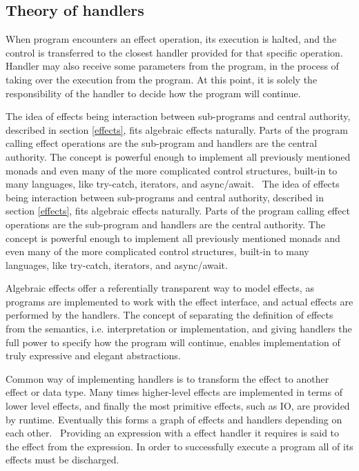 \subsection{Theory of handlers}
When program encounters an effect operation, its execution is halted, and the control is transferred to the closest handler provided for that specific operation. Handler may also receive some parameters from the program, in the process of taking over the execution from the program. At this point, it is solely the responsibility of the handler to decide how the program will continue.

The idea of effects being interaction between sub-programs and central authority, described in section \ref{effects}, fits algebraic effects naturally. Parts of the program calling effect operations are the sub-program and handlers are the central authority. The concept is powerful enough to implement all previously mentioned monads and even many of the more complicated control structures, built-in to many languages, like try-catch, iterators, and async/await.~\cite{alg-effs-for-fp}
The idea of effects being interaction between sub-programs and central authority, described in section \ref{effects}, fits algebraic effects naturally. Parts of the program calling effect operations are the sub-program and handlers are the central authority. The concept is powerful enough to implement all previously mentioned monads and even many of the more complicated control structures, built-in to many languages, like try-catch, iterators, and async/await.~\cite{alg-effs-for-fp}

Algebraic effects offer a referentially transparent way to model effects, as programs are implemented to work with the effect interface, and actual effects are performed by the handlers. The concept of separating the definition of effects from the semantics, i.e. interpretation or implementation, and giving handlers the full power to specify how the program will continue, enables implementation of truly expressive and elegant abstractions.

Common way of implementing handlers is to transform the effect to another effect or data type. Many times higher-level effects are implemented in terms of lower level effects, and finally the most primitive effects, such as IO, are provided by runtime. Eventually this forms a graph of effects and handlers depending on each other.~\cite{intro-to-alg-eff} Providing an expression with a effect handler it requires is said to  the effect from the expression. In order to successfully execute a program all of its effects must be discharged.

